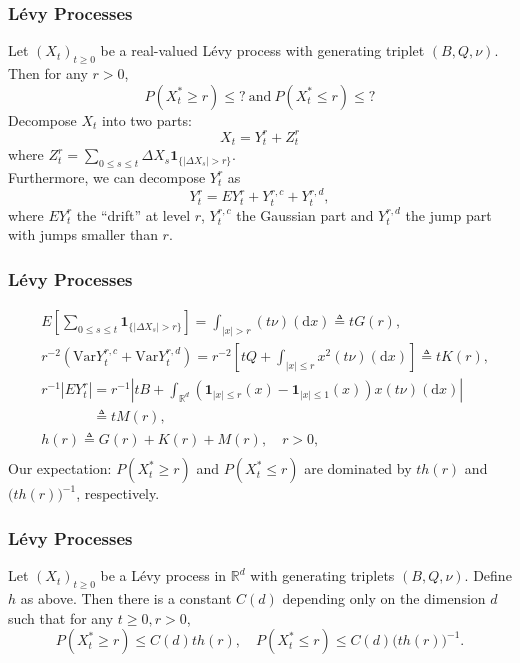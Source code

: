 \documentclass[12pt]{beamer}
\def\RR{\mathbb{R}}
\def\d{\mathrm{d}}
\def\Var{\mathrm{Var}}
\def\ind{\mathbf{1}}
\begin{document}
\begin{frame}
	\frametitle{L\'evy Processes}
	Let $(X_t)_{t\ge0}$ be a real-valued L\'evy process with generating triplet $(B,Q,\nu)$. Then for any $r>0$,
	$$
	P(X_t^* \ge r) \le ? \mathrm{\ and\ } P(X_t^* \le r) \le ?
	$$
	\pause
	Decompose $X_t$ into two parts:
	$$
	X_t = Y_t^r + Z_t^r
	$$
	where $Z_t^r=\sum_{0\le s\le t}\Delta X_s \ind_{\{|\Delta X_s| > r\}}$. \\[1ex]
	\pause
	Furthermore, we can decompose $Y_t^r$ as
	$$
	Y_t^r = E Y_t^r + Y_t^{r,c} + Y_t^{r,d},
	$$
	where $E Y_t^r$ the ``drift'' at level $r$, $Y_t^{r,c}$ the Gaussian part and $Y_t^{r,d}$ the jump part with jumps smaller than $r$.
\end{frame}
\begin{frame}
	\frametitle{L\'evy Processes}
	\begin{equation*}
		\begin{split}
			& E \left[{\textstyle\sum_{0\le s\le t}} \ind_{\{|\Delta X_s| > r\}}\right] =\int_{|x|>r}(t\nu)(\d x) \triangleq tG(r), \\[1ex]
			& r^{-2} (\Var Y_t^{r,c} + \Var Y_t^{r,d}) = r^{-2}\left[ tQ+\int_{|x|\le r}x^2(t\nu)(\d x) \right] \triangleq tK(r),\\[1ex]
			& r^{-1} |E Y_t^r| = r^{-1}\left|tB+\int_{\RR^d}\left(\ind_{|x|\le r}(x)-\ind_{|x|\le 1}(x)\right)x(t\nu)(\d x) \right| \\
			& \phantom{r^{-1} |E Y_t^r|} \triangleq tM(r),\\[1.5ex]
			& h(r) \triangleq G(r)+K(r)+M(r),\quad r>0,\\[1ex]
		\end{split}
	\end{equation*}
	\pause
	Our expectation: $P(X_t^* \ge r)$ and $P(X_t^* \le r)$ are dominated by $th(r)$ and $\big(th(r)\big)^{-1}$, respectively.
\end{frame}
\begin{frame}
	\frametitle{L\'evy Processes}
	\begin{lemma}
		Let $(X_t)_{t\ge 0}$ be a L\'evy process in $\RR^d$ with generating triplets $(B,Q,\nu)$. Define $h$ as above. Then there is a constant $C(d)$ depending only on the dimension $d$ such that for any $t\ge0,r>0$,
		\begin{equation*}
			P(X_t^*\ge r) \le C(d)th(r),\quad P(X_t^*\le r) \le C(d)\big(th(r)\big)^{-1}.
		\end{equation*}
	\end{lemma}
\end{frame}
\end{document}
